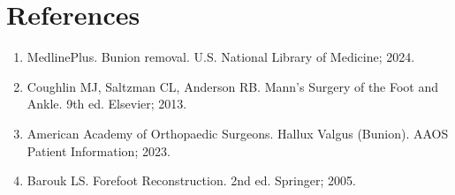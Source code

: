 \section*{References}
\begin{enumerate}
  \item MedlinePlus. Bunion removal. U.S. National Library of Medicine; 2024.
  \item Coughlin MJ, Saltzman CL, Anderson RB. Mann's Surgery of the Foot and Ankle. 9th ed. Elsevier; 2013.
  \item American Academy of Orthopaedic Surgeons. Hallux Valgus (Bunion). AAOS Patient Information; 2023.
  \item Barouk LS. Forefoot Reconstruction. 2nd ed. Springer; 2005.
\end{enumerate}

\clearpage
